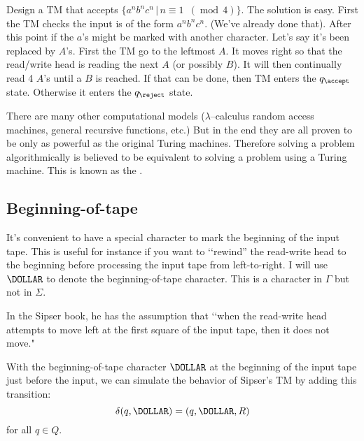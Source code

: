 









\begin{eg}
Design a TM that accepts $\{a^nb^nc^n \,|\, n \equiv 1
\,\,\,(\operatorname{mod} \, 4)\}$. The solution is easy. First
the TM checks the input is of the form $a^nb^nc^n$. (We've already
done that). After this point if the $a$'s might be marked with
another character. Let's say it's been replaced by $A$'s. First
the TM go to the leftmost $A$. It moves right so that the
read/write head is reading the next $A$ (or possibly $B$). It will
then continually read 4 $A$'s until a $B$ is reached. If that can
be done, then TM enters the $q_{\accept}$ state. Otherwise it
enters the $q_{\reject}$ state.
\end{eg}


There are many other computational models ($\lambda$--calculus
random access machines, general recursive functions, etc.) But in
the end they are all proven to be only as powerful as the original
Turing machines. Therefore solving a problem algorithmically is
believed to be equivalent to solving a problem using a Turing
machine. This is known as the
.



\newpage
\subsection{Beginning-of-tape}

It's convenient to have a special character to mark the beginning of
the input tape.
This is useful for instance if you want to \lq\lq rewind'' the read-write
head to the beginning before processing the input tape from left-to-right.
I will use $\DOLLAR$ to denote the beginning-of-tape character.
This is a character in $\Gamma$ but not in $\Sigma$.

In the Sipser book, he has the assumption that \lq\lq when the read-write
head attempts to move left at the first square of the input tape,
then it does not move."

With the beginning-of-tape character $\DOLLAR$ at the beginning of the
input tape just before the input, we can simulate the behavior of
Sipser's TM by adding this transition:
\[
\delta(q, \DOLLAR) = (q, \DOLLAR, R)
\]
for all $q \in Q$.

